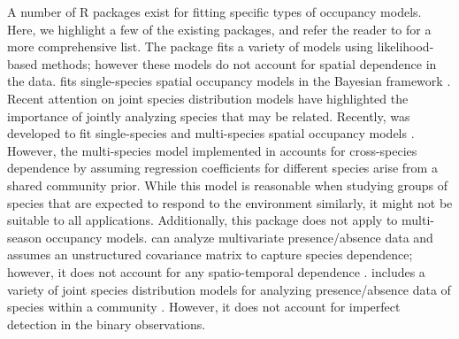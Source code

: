 A number of R packages exist for fitting specific types of occupancy models. Here, we highlight a few of the existing packages, and refer the reader to \citet{doser2022spoccupancy} for a more comprehensive list. The package  fits a variety of models using likelihood-based methods; however these models do not account for spatial dependence in the data.  fits single-species spatial occupancy models in the Bayesian framework \citep{johnson2013}. Recent attention on joint species distribution models have highlighted the importance of jointly analyzing species that may be related. Recently,  was developed to fit single-species and multi-species spatial occupancy models \citep{doser2022spoccupancy}. However, the multi-species model implemented in  accounts for cross-species dependence by assuming regression coefficients for different species arise from a shared community prior. While this model is reasonable when studying groups of species that are expected to respond to the environment similarly, it might not be suitable to all applications. Additionally, this package does not apply to multi-season occupancy models.  can analyze multivariate presence/absence data and assumes an unstructured covariance matrix to capture species dependence; however, it does not account for any spatio-temporal dependence \citep{clark2017generalized}.   includes a variety of joint species distribution models for analyzing presence/absence data of species within a community \citep{tikhonov2020joint, ovaskainen2017make}. However, it does not account for imperfect detection in the binary observations. 

